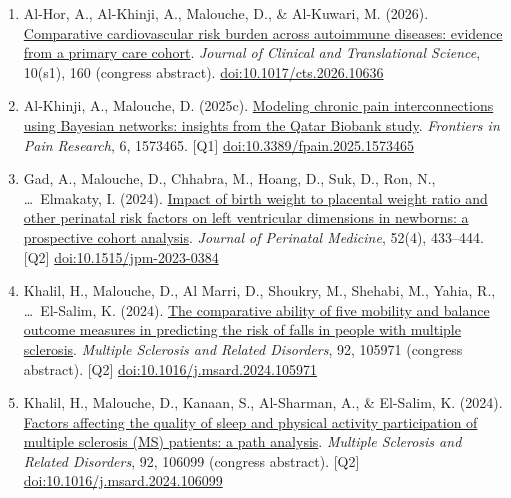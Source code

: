 \documentclass[10pt,a4paper]{article}
\newcommand{\doi}[1]{\href{https://doi.org/#1}{doi:#1}}
\newcommand{\Qu}[1]{[Q#1]}
\begin{document}
\begin{enumerate}[resume*]
\item Al-Hor, A., Al-Khinji, A., Malouche, D., \& Al-Kuwari, M. (2026). \href{https://doi.org/10.1017/cts.2026.10636}{Comparative cardiovascular risk burden across autoimmune diseases: evidence from a primary care cohort}. \emph{Journal of Clinical and Translational Science}, 10(s1), 160 (congress abstract). \doi{10.1017/cts.2026.10636}
\item Al-Khinji, A., Malouche, D. (2025c). \href{https://doi.org/10.3389/fpain.2025.1573465}{Modeling chronic pain interconnections using Bayesian networks: insights from the Qatar Biobank study}. \emph{Frontiers in Pain Research}, 6, 1573465. \Qu1 \doi{10.3389/fpain.2025.1573465}
\item Gad, A., Malouche, D., Chhabra, M., Hoang, D., Suk, D., Ron, N., \ldots\ Elmakaty, I. (2024). \href{https://doi.org/10.1515/jpm-2023-0384}{Impact of birth weight to placental weight ratio and other perinatal risk factors on left ventricular dimensions in newborns: a prospective cohort analysis}. \emph{Journal of Perinatal Medicine}, 52(4), 433--444. \Qu2 \doi{10.1515/jpm-2023-0384}
\item Khalil, H., Malouche, D., Al Marri, D., Shoukry, M., Shehabi, M., Yahia, R., \ldots\ El-Salim, K. (2024). \href{https://doi.org/10.1016/j.msard.2024.105971}{The comparative ability of five mobility and balance outcome measures in predicting the risk of falls in people with multiple sclerosis}. \emph{Multiple Sclerosis and Related Disorders}, 92, 105971 (congress abstract). \Qu2 \doi{10.1016/j.msard.2024.105971}
\item Khalil, H., Malouche, D., Kanaan, S., Al-Sharman, A., \& El-Salim, K. (2024). \href{https://doi.org/10.1016/j.msard.2024.106099}{Factors affecting the quality of sleep and physical activity participation of multiple sclerosis (MS) patients: a path analysis}. \emph{Multiple Sclerosis and Related Disorders}, 92, 106099 (congress abstract). \Qu2 \doi{10.1016/j.msard.2024.106099}


\end{enumerate}
\end{document}
